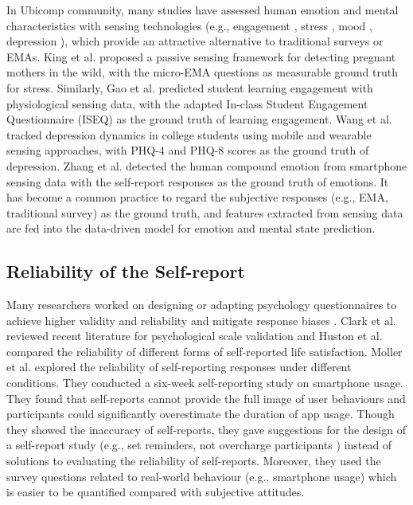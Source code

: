 \documentclass[sigconf]{acmart}
\begin{document}
In Ubicomp community, many studies have assessed human emotion and mental characteristics with sensing technologies (e.g., engagement \cite{gao2020n,huynh2018engagemon}, stress \cite{king2019microstress}, mood \cite{morshed2019prediction,wang2014studentlife}, depression \cite{bakker2011what,wang2018trackingdepression}), which provide an attractive alternative to traditional surveys or EMAs.  King et al. \cite{king2019microstress} proposed a passive sensing framework for detecting pregnant mothers in the wild, with the micro-EMA questions as measurable ground truth for stress. Similarly, Gao et al. \cite{gao2020n} predicted student learning engagement with physiological sensing data, with the adapted In-class Student Engagement Questionnaire (ISEQ) \cite{fuller2018development} as the ground truth of learning engagement. Wang et al. \cite{wang2018trackingdepression} tracked depression dynamics in college students using  mobile and wearable sensing approaches, with PHQ-4 \cite{kroenke2009phq4} and PHQ-8 \cite{kroenke2009phq8} scores as the ground truth of depression. Zhang et al. \cite{Moodexplorer} detected the human compound emotion from smartphone sensing data with the self-report responses as the ground truth of emotions. It has become a common practice to regard the subjective responses (e.g., EMA, traditional survey) as the ground truth, and features extracted from sensing data are fed into the data-driven model for emotion and mental state prediction.

\subsection{Reliability of the Self-report}
Many researchers worked on designing or adapting psychology questionnaires to achieve higher validity and reliability and mitigate response biases \cite{barclay2002not,jackson2018stepovers,sonderen2013ineffectiveness, clark2019constructing,hudson2020comparing}. Clark et al. \cite{clark2019constructing} reviewed recent literature for psychological scale validation and Huston et al. \cite{hudson2020comparing} compared the reliability of different forms of self-reported life satisfaction.
Moller et al. \cite{moller2013investigating} explored the reliability of self-reporting responses under different conditions. They conducted a six-week self-reporting study on smartphone usage. They found that self-reports cannot provide the full image of user behaviours and participants could significantly overestimate the duration of app usage. Though they showed the inaccuracy of self-reports, they gave suggestions for the design of a self-report study (e.g., set reminders, not overcharge participants ) instead of solutions to evaluating the reliability of self-reports. Moreover, they used the survey questions related to real-world behaviour (e.g., smartphone usage) which is easier to be quantified compared with subjective attitudes. 
\end{document}
